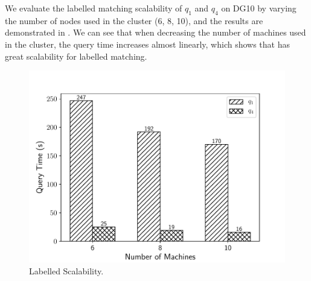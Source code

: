  We evaluate the labelled matching scalability of $q_1$ and $q_4$ on DG10 by varying the number of nodes used in the cluster (6, 8, 10), and the results are demonstrated in . We can see that when decreasing the number of machines used in the cluster, the query time increases almost linearly, which shows that \gencliqjoin has great scalability for labelled matching.

\begin{figure}[htb]
  \centering
  \includegraphics[scale=0.4]{figures/exp5.pdf}
  \caption{\small{Labelled Scalability.}}
  \label{fig:l_sca}
\end{figure}